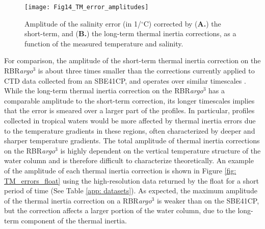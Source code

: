 \documentclass{ametsocV6.1}
\begin{document}
\begin{figure}[t]
	\centering
	\texttt{[image: Fig14\_TM\_error\_amplitudes]}\\
	\caption{Amplitude of the salinity error (in 1/$^{\circ}$C) corrected by (\textbf{A.}) the short-term, and (\textbf{B.}) the long-term thermal inertia corrections, as a function of the measured temperature and salinity.}
	\label{fig: TM_errors}
\end{figure}

For comparison, the amplitude of the short-term thermal inertia correction on the RBR\textit{argo}$^3$ is about three times smaller than the corrections currently applied to CTD data collected from an SBE41CP, and operates over similar timescales \citep{Johnson_2007}. While the long-term thermal inertia correction on the RBR\textit{argo}$^3$ has a comparable amplitude to the short-term correction, its longer timescales implies that the error is smeared over a larger part of the profiles. In particular, profiles collected in tropical waters would be more affected by thermal inertia errors due to the temperature gradients in these regions, often characterized by deeper and sharper temperature gradients.  The total amplitude of thermal inertia corrections on the RBR\textit{argo}$^3$ is highly dependent on the vertical temperature structure of the water column and is therefore difficult to characterize theoretically.  An example of the amplitude of each thermal inertia correction is shown in Figure \ref{fig: TM_errors_float} using the high-resolution data returned by the float for a short period of time (See Table \ref{app: datasets}).  As expected,  the maximum amplitude of the thermal inertia correction on a RBR\textit{argo}$^3$ is weaker than on the SBE41CP, but the correction affects a larger portion of the water column, due to the long-term component of the thermal inertia. 
\end{document}
